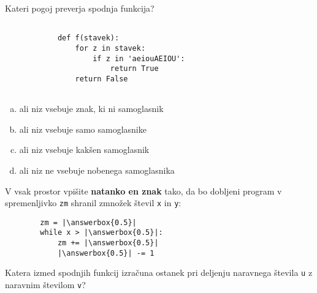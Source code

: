 \documentclass[arhiv, 10pt]{../izpit}
\newcommand{\inlinepy}[1]{\texttt{#1}}
\newcommand{\answerbox}[1]{\framebox{\vphantom{\large M}\hspace{#1cm}}}
\begin{document}
        \naloga*

        \begin{multicols}{2}
        \noindent
        Kateri pogoj preverja spodnja funkcija?
        \begin{verbatim}
        
            def f(stavek):
                for z in stavek:
                    if z in 'aeiouAEIOU':
                        return True
                return False
            
        \end{verbatim}

        \begin{enumerate}[(a)]
\item ali niz vsebuje znak, ki ni samoglasnik
\item ali niz vsebuje samo samoglasnike
\item ali niz vsebuje kakšen samoglasnik
\item ali niz ne vsebuje nobenega samoglasnika
\end{enumerate}

        \end{multicols}
    
        \naloga*
        \begin{multicols}{2}
        \noindent
        V vsak prostor vpišite \textbf{natanko en znak} tako, da bo dobljeni program v spremenljivko \inlinepy{zm} shranil zmnožek števil \inlinepy{x} in \inlinepy{y}:
        
        \columnbreak
        \begin{verbatim}
        zm = |\answerbox{0.5}|
        while x > |\answerbox{0.5}|:
            zm += |\answerbox{0.5}|
            |\answerbox{0.5}| -= 1
        \end{verbatim}
        \end{multicols}
    
        \clearpage
        \naloga
        
        Katera izmed spodnjih funkcij izračuna ostanek pri deljenju naravnega števila \inlinepy{u} z naravnim številom \inlinepy{v}?
    
\end{document}
